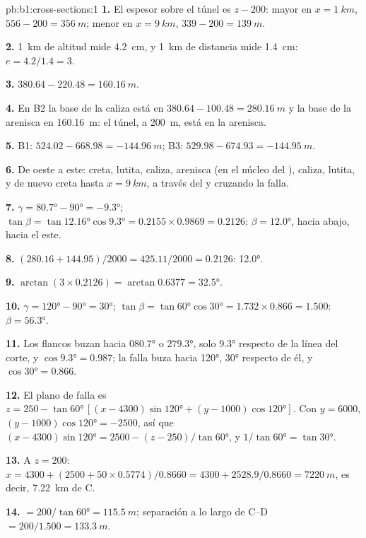 \begin{solution}{pb:b1:cross-sections:1}
\textbf{1.} El espesor sobre el túnel es $z - 200$: mayor en $x = \qty{1}{km}$,
$556 - 200 = \qty{356}{m}$; menor en $x =
\qty{9}{km}$, $339 - 200 = \qty{139}{m}$.

\textbf{2.} \qty{1}{km} de altitud mide \qty{4.2}{cm}, y \qty{1}{km} de distancia mide
\qty{1.4}{cm}: $e = 4.2/1.4 = 3$.

\textbf{3.} $380.64 - 220.48 = \qty{160.16}{m}$.

\textbf{4.} En B2 la base de la caliza está en $380.64 - 100.48 =
\qty{280.16}{m}$ y la base de la arenisca en \qty{160.16}{m}: el túnel, a \qty{200}{m}, está en la
arenisca.

\textbf{5.} B1: $524.02 - 668.98 = \qty{-144.96}{m}$; B3: $529.98 - 674.93 =
\qty{-144.95}{m}$.

\textbf{6.} De oeste a este: creta, lutita, caliza, arenisca (en el núcleo del ), caliza,
lutita, y de nuevo creta hasta $x = \qty{9}{km}$, a través del  y cruzando la falla.

\textbf{7.} $\gamma = \ang{80.7} - \ang{90} = \ang{-9.3}$; $\tan\beta =
\tan\ang{12.16}\cos\ang{9.3} = 0.2155\times0.9869 = 0.2126$: $\beta =
\ang{12.0}$, hacia abajo, hacia el este.

\textbf{8.} $(280.16 + 144.95)/2000 = 425.11/2000 = 0.2126$: \ang{12.0}.

\textbf{9.} $\arctan(3\times0.2126) = \arctan 0.6377 = \ang{32.5}$.

\textbf{10.} $\gamma = \ang{120} - \ang{90} = \ang{30}$; $\tan\beta =
\tan\ang{60}\cos\ang{30} = 1.732\times0.866 = 1.500$: $\beta = \ang{56.3}$.

\textbf{11.} Los flancos buzan hacia \ang{080.7} o \ang{279.3}, solo \ang{9.3} respecto de la línea
del corte, y $\cos\ang{9.3} = 0.987$; la falla buza hacia \ang{120}, \ang{30} respecto de él, y
$\cos\ang{30} = 0.866$.

\textbf{12.} El plano de falla es $z = 250 - \tan\ang{60}\,[(x - 4300)
\sin\ang{120} + (y - 1000)\cos\ang{120}]$. Con $y = 6000$, $(y - 1000)
\cos\ang{120} = -2500$, así que $(x - 4300)\sin\ang{120} = 2500 - (z - 250)/
\tan\ang{60}$, y $1/\tan\ang{60} = \tan\ang{30}$.

\textbf{13.} A $z = 200$: $x = 4300 + (2500 + 50\times0.5774)/0.8660 =
4300 + 2528.9/0.8660 = \qty{7220}{m}$, es decir, \qty{7.22}{km} de C.

\textbf{14.}  $= 200/\tan\ang{60} = \qty{115.5}{m}$; separación a lo largo de
C--D $= 200/1.500 = \qty{133.3}{m}$.


\end{solution}
